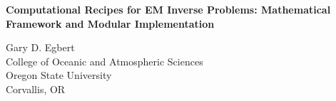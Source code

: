\documentclass[12pt]{article}
\begin{document}
\begin{center}
{\bf \Large Computational Recipes for EM Inverse Problems:
Mathematical Framework and Modular Implementation}
\end{center}
\vspace{30pt}
\begin{center}
Gary D. Egbert \\
College of Oceanic and Atmospheric Sciences \\
Oregon State University \\
Corvallis, OR
\end{center}






\pagebreak



 

 

 

 

 

 
\end{document}
